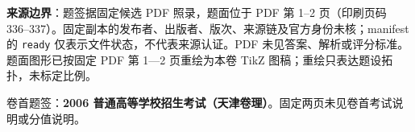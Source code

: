 

\begin{gktip}
\textbf{来源边界}：题签据固定候选 PDF 照录，题面位于 PDF 第 1–2 页（印刷页码 336–337）。固定副本的发布者、出版者、版次、来源链及官方身份未核；manifest 的 \texttt{ready} 仅表示文件状态，不代表来源认证。PDF 未见答案、解析或评分标准。题面图形已按固定 PDF 第 1—2 页重绘为本卷 TikZ 图稿；重绘只表达题设拓扑，未标定比例。
\end{gktip}

卷首题签：\textbf{2006 普通高等学校招生考试（天津卷理）}。固定两页未见卷首考试说明或分值说明。


